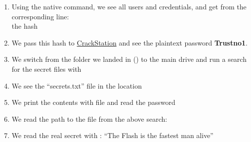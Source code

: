 {\begin{enumerate}
\begin{enumerate}
	\item We run the module
	\end{enumerate}
	That way we see the standard shares  and  as well as the nonstandard , which will be the answer we look for.
\item Using the native  command, we see all users and credentials, and get from the corresponding line:\\
 the hash 
\item We pass this hash to \href{https://crackstation.net/}{CrackStation} and see the plaintext password \textbf{Trustno1}.
\item We switch from the folder we landed in () to the main drive and run a search for the secret files with 
\item We see the ``secrets.txt'' file in the location \textbf{}
\item We print the contents with  file and read the password 
\item We read the path to the  file from the above  search: 
\item We read the real secret with : ``The Flash is the fastest man alive''
\end{enumerate}
}